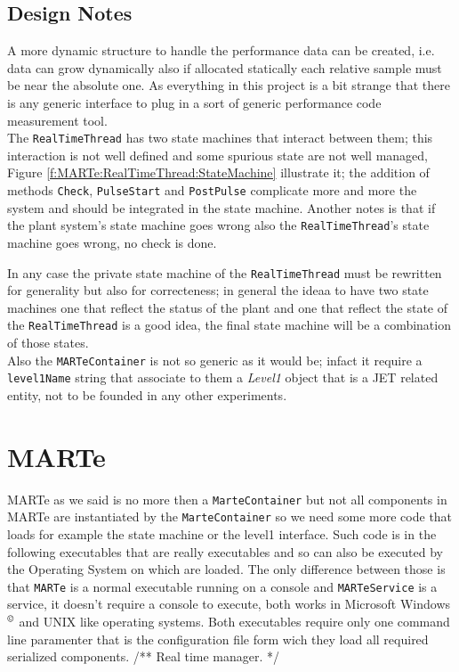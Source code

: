 \subsection{Design Notes}
A more dynamic structure to handle the performance data can be created, i.e. data can grow dynamically also if allocated statically each relative sample must be near the absolute one. As everything in this project is a bit strange that there is any generic interface to plug in a sort of generic performance code measurement tool. \\


The \texttt{RealTimeThread} has two state machines that interact between them; this interaction is not well defined and some spurious state are not well managed, Figure \ref{f:MARTe:RealTimeThread:StateMachine} illustrate it; the addition of methods \texttt{Check}, \texttt{PulseStart} and \texttt{PostPulse} complicate more and more the system and should be integrated in the state machine. Another notes is that if the plant system's state machine goes wrong also the \texttt{RealTimeThread}'s state machine goes wrong, no check is done.

In any case the private state machine of the \texttt{RealTimeThread} must be rewritten for generality but also for correcteness; in general the ideaa to have two state machines one that reflect the status of the plant and one that reflect the state of the \texttt{RealTimeThread} is a good idea, the final state machine will be a combination of those states. \\


Also the \texttt{MARTeContainer} is not so generic as it would be; infact it require a \texttt{level1Name} string that associate to them a \textit{Level1} object that is a JET related entity, not to be founded in any other experiments. \\



\section{MARTe}
MARTe as we said is no more then a \texttt{MarteContainer} but not all components in MARTe are instantiated by the \texttt{MarteContainer} so we need some more code that loads for example the state machine or the level1 interface. Such code is in the following executables that are really executables and so can also be executed by the Operating System on which are loaded. The only difference between those is that \texttt{MARTe} is a normal executable running on a console and \texttt{MARTeService} is a service, it doesn't require a console to execute, both works in Microsoft Windows$^\copyright$ and UNIX like operating systems. Both executables require only one command line paramenter that is the configuration file form wich they load all required serialized components.
/** Real time manager. */


